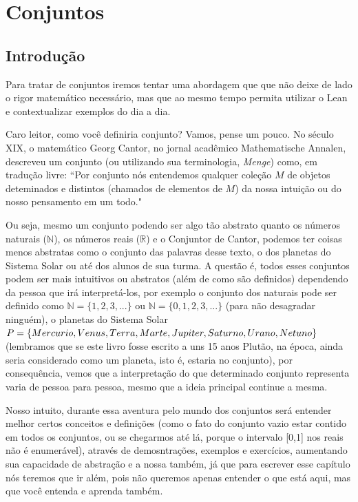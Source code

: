 \chapter{Conjuntos}

\section{Introdução}

    Para tratar de conjuntos iremos tentar uma abordagem que que não deixe de lado o rigor matemático necessário, mas que ao mesmo tempo permita utilizar o Lean e contextualizar exemplos do dia a dia. 
    
    Caro leitor, como você definiria conjunto? Vamos, pense um pouco. No século XIX, o matemático Georg Cantor, no jornal acadêmico Mathematische Annalen, descreveu um conjunto (ou utilizando sua terminologia, \textit{Menge}) como, em tradução livre: “Por conjunto nós entendemos qualquer coleção $M$ de objetos deteminados e distintos (chamados de elementos de $M$) da nossa intuição ou do nosso pensamento em um todo."
    
    Ou seja, mesmo um conjunto podendo ser algo tão abstrato quanto os números naturais ($\mathbb{N}$), os números reais ($\mathbb{R}$) e o Conjuntor de Cantor, podemos ter coisas menos abstratas como o conjunto das palavras desse texto, o dos planetas do Sistema Solar ou até dos alunos de sua turma. A questão é, todos esses conjuntos podem ser mais intuitivos ou abstratos (além de como são definidos) dependendo da pessoa que irá interpretá-los, por exemplo o conjunto dos naturais pode ser definido como $\mathbb{N} = \{1,2,3,...\}$ ou $\mathbb{N}=\{0,1,2,3,...\}$ (para não desagradar ninguém), o planetas do Sistema Solar $ P = \{ Mercurio, Venus, Terra, \\ Marte, Jupiter, Saturno, Urano, Netuno \}$ (lembramos que se este livro fosse escrito a uns 15 anos Plutão, na época, ainda seria considerado como um planeta, isto é, estaria no conjunto), por consequência, vemos que a interpretação do que determinado conjunto representa varia de pessoa para pessoa, mesmo que a ideia principal continue a mesma.
    
    Nosso intuito, durante essa aventura pelo mundo dos conjuntos será entender melhor certos conceitos e definições (como o fato do conjunto vazio estar contido em todos os conjuntos, ou se chegarmos até lá, porque o intervalo [0,1] nos reais não é enumerável), através de demosntrações, exemplos e exercícios, aumentando sua capacidade de abstração e a nossa também, já que para escrever esse capítulo nós teremos que ir além, pois não queremos apenas entender o que está aqui, mas que você entenda e aprenda também.

